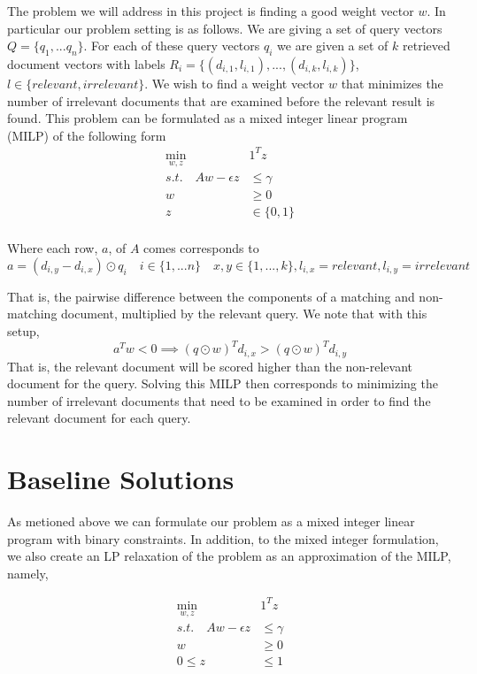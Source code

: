\documentclass[a4paper]{article}
\begin{document}
The problem we will address in this project is finding a good weight vector $w$. In particular our
problem setting is as follows. We are giving a set of query vectors $Q = \{q_1, ... q_n\}$. For each 
of these query vectors $q_i$ we are given a set of $k$ retrieved document vectors with labels $R_i = \{(d_{i,1}, l_{i,1}), ..., (d_{i, k}, l_{i,k})\}$, 
$l \in \{relevant, irrelevant\}$.
We wish to find a weight vector $w$ that minimizes the number of irrelevant documents that are examined 
before the relevant result is found. This problem can be formulated as a mixed integer linear program (MILP)
of the following form
\begin{align*}
\min_{w,z}\quad &1^Tz\\
s.t. \quad Aw - \epsilon z &\leq \gamma\\
		w &\geq 0\\
		z &\in \{0,1\}\\
\end{align*}

Where each row, $a$, of $A$ comes corresponds to 
$$
a = (d_{i,y} - d_{i,x}) \odot q_i  \quad i \in \{1,...n\} \quad x,y \in \{1,...,k\}, l_{i,x} = relevant, l_{i,y} = irrelevant
$$

That is, the pairwise difference between the components of a matching and non-matching document, multiplied by the 
relevant query. We note that with this setup, 
$$
a^Tw < 0 \implies (q\odot w)^Td_{i,x} > (q\odot w)^Td_{i,y}
$$
That is, the relevant document will be scored higher than the non-relevant document for the query. Solving this 
MILP then corresponds to minimizing the number of irrelevant documents that need to be 
examined in order to find the relevant document for each query. 


\section{Baseline Solutions}

As metioned above we can formulate our problem as a mixed integer linear program 
with binary constraints. In addition, to the mixed integer formulation, we also create an LP
relaxation of the problem as an approximation of the MILP, namely, 

\begin{align*}
\min_{w,z}\quad &1^Tz\\
s.t. \quad Aw - \epsilon z &\leq \gamma\\
		w &\geq 0\\
		0 \leq z &\leq 1\\
\end{align*}
\end{document}
